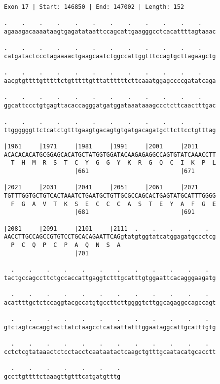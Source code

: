 \documentclass{article}
\begin{document}
\begin{Verbatim}[fontfamily=courier]
Exon 17 | Start: 146850 | End: 147002 | Length: 152

.    .    .    .    .    .    .    .    .    .    .    .    
agaaagacaaaataagtgagatataattccagcattgaagggcctcacattttagtaaac

.    .    .    .    .    .    .    .    .    .    .    .    
catgatactccctagaaaactgaagcaatctggccattggtttccagtgcttagaagctg

.    .    .    .    .    .    .    .    .    .    .    .    
aacgtgttttgtttttctgtttttgtttattttttcttcaaatggagccccgatatcaga

.    .    .    .    .    .    .    .    .    .    .    .    
ggcattccctgtgagttacaccagggatgatggataaataaagccctcttcaactttgac

.    .    .    .    .    .    .    .    .    .    .    .    
ttggggggttctcatctgtttgaagtgacagtgtgatgacagatgcttcttcctgtttag

|1961     |1971     |1981     |1991     |2001     |2011     
ACACACACATGCGGAGCACATGCTATGGTGGATACAAGAGAGGCCAGTGTATCAAACCTT
  T  H  M  R  S  T  C  Y  G  G  Y  K  R  G  Q  C  I  K  P  L
                    |661                          |671      

|2021     |2031     |2041     |2051     |2061     |2071     
TGTTTGGTGCTGTCACTAAATCTGAATGCTGTTGCGCCAGCACTGAGTATGCATTTGGGG
  F  G  A  V  T  K  S  E  C  C  C  A  S  T  E  Y  A  F  G  E
                    |681                          |691      

|2081     |2091     |2101     |2111  .    .    .    .    .  
AACCTTGCCAGCCGTGTCCTGCACAGAATTCAGgtatgtggtatcatggagatgccctcg
  P  C  Q  P  C  P  A  Q  N  S  A                           
                    |701                                    

  .    .    .    .    .    .    .    .    .    .    .    .  
tactgccagccttctgccaccattgaggtctttgcatttgtggaattcacagggaagatg

  .    .    .    .    .    .    .    .    .    .    .    .  
acattttgctctccaggtacgccatgtgccttcttggggtcttggcagaggccagccagt

  .    .    .    .    .    .    .    .    .    .    .    .  
gtctagtcacaggtacttatctaagcctcataattatttggaataggcattgcatttgtg

  .    .    .    .    .    .    .    .    .    .    .    .  
cctctcgtataaactctcctacctcaataatactcaagctgtttgcaatacatgcacctt

  .    .    .    .    .    .    .
gccttgttttctaaagttgtttcatgatgtttg
\end{Verbatim}
\end{document}
